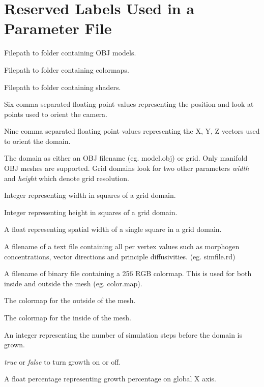\section{Reserved Labels Used in a Parameter File}
\label{appendix:Reservedlabels}
\begin{description}[itemsep=0cm]
    \item[ModelsPath:] Filepath to folder containing OBJ models.
    \item[ColorMapsPath:] Filepath to folder containing colormaps.
    \item[ShadersPath:] Filepath to folder containing shaders.
    \item[camera:] Six comma separated floating point values representing the position and look at points used to orient the camera.
    \item[model:] Nine comma separated floating point values representing the X, Y, Z vectors used to orient the domain. 
    \item[domain:] The domain as either an OBJ filename (eg. model.obj) or grid. Only manifold OBJ meshes are supported. Grid domains look for two other parameters \textit{width} and \textit{height} which denote grid resolution.
    \item[xRes:] Integer representing width in squares of a grid domain.
    \item[yRes:] Integer representing height in squares of a grid domain.
    \item[cellSize:] A float representing spatial width of a single square in a grid domain.    
    \item[simFile:] A filename of a text file containing all per vertex values such as morphogen concentrations, vector directions and principle diffusivities. (eg. simfile.rd)
    \item[colorMap:] A filename of binary file containing a 256 RGB colormap. This is used for both inside and outside the mesh (eg. color.map).
    \item[colorMapOutside:] The colormap for the outside of the mesh.
    \item[colorMapInside:] The colormap for the inside of the mesh.
    \item[growthTickLimit:] An integer representing the number of simulation steps before the domain is grown.
    \item[growing:] \textit{true} or \textit{false} to turn growth on or off.
    \item[growthX:] A float percentage representing growth percentage on global X axis.

\end{description}
